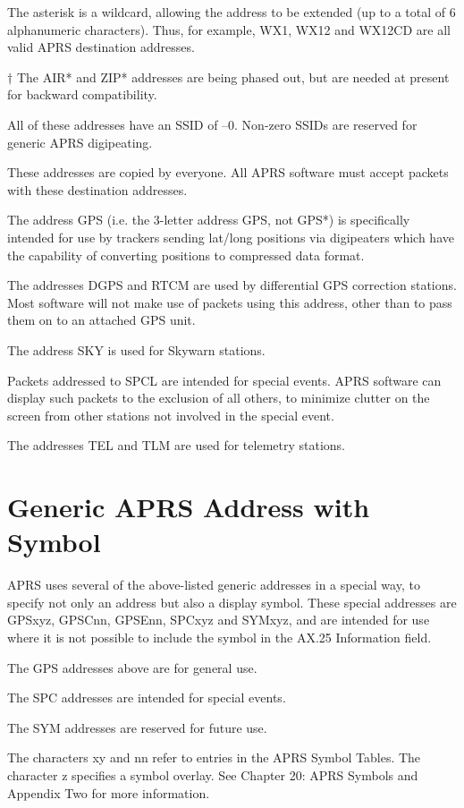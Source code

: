 The asterisk is a wildcard, allowing the address to be extended (up to a total
of 6 alphanumeric characters). Thus, for example, WX1, WX12 and WX12CD
are all valid APRS destination addresses.

$\dagger$ The AIR* and ZIP* addresses are being phased out, but are needed at
present for backward compatibility.

All of these addresses have an SSID of –0. Non-zero SSIDs are reserved for
generic APRS digipeating.

These addresses are copied by everyone. All APRS software must accept
packets with these destination addresses.

The address GPS (i.e. the 3-letter address GPS, not GPS*) is specifically
intended for use by trackers sending lat/long positions via digipeaters which
have the capability of converting positions to compressed data format.

The addresses DGPS and RTCM are used by differential GPS correction
stations. Most software will not make use of packets using this address, other
than to pass them on to an attached GPS unit.

The address SKY is used for Skywarn stations.

Packets addressed to SPCL are intended for special events. APRS software
can display such packets to the exclusion of all others, to minimize clutter on
the screen from other stations not involved in the special event.

The addresses TEL and TLM are used for telemetry stations.

\section{Generic APRS Address with Symbol}

APRS uses several of the above-listed generic addresses in a special
way, to specify not only an address but also a display symbol. These
special addresses are \textsf {GPSxyz, GPSCnn, GPSEnn, SPCxyz} and
\textsf {SYMxyz}, and are intended for use where it is not possible to
include the symbol in the AX.25 Information field.

The GPS addresses above are for general use.

The SPC addresses are intended for special events.

The SYM addresses are reserved for future use.

The characters \textsf{xy} and \textsf{nn} refer to entries in the
APRS Symbol Tables. The character \textsf{z} specifies a symbol
overlay. See Chapter 20: APRS Symbols and Appendix Two for more
information.


